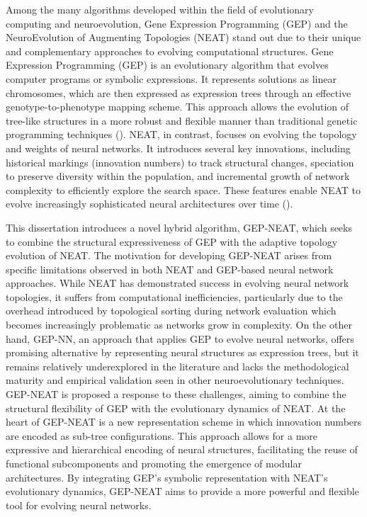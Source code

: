 \noindent Among the many algorithms developed within the field of evolutionary computing and neuroevolution, Gene Expression Programming (GEP) and the NeuroEvolution of Augmenting Topologies (NEAT) stand out due to their unique and complementary approaches to evolving computational structures. Gene Expression Programming (GEP) is an evolutionary algorithm that evolves computer programs or symbolic expressions. It represents solutions as linear chromosomes, which are then expressed as expression trees through an effective genotype-to-phenotype mapping scheme. This approach allows the evolution of tree-like structures in a more robust and flexible manner than traditional genetic programming techniques (\cite{ferreira2006gene}). NEAT, in contrast, focuses on evolving the topology and weights of neural networks. It introduces several key innovations, including historical markings (innovation numbers) to track structural changes, speciation to preserve diversity within the population, and incremental growth of network complexity to efficiently explore the search space. These features enable NEAT to evolve increasingly sophisticated neural architectures over time (\cite{stanley2002evolving}).

\parbreak

\noindent This dissertation introduces a novel hybrid algorithm, GEP-NEAT, which seeks to combine the structural expressiveness of GEP with the adaptive topology evolution of NEAT. The motivation for developing GEP-NEAT arises from specific limitations observed in both NEAT and GEP-based neural network approaches. While NEAT has demonstrated success in evolving neural network topologies, it suffers from computational inefficiencies, particularly due to the overhead introduced by topological sorting during network evaluation which becomes increasingly problematic as networks grow in complexity. On the other hand, GEP-NN, an approach that applies GEP to evolve neural networks, offers promising alternative by representing neural structures as expression trees, but it remains relatively underexplored in the literature and lacks the methodological maturity and empirical validation seen in other neuroevolutionary techniques. GEP-NEAT is proposed a response to these challenges, aiming to combine the structural flexibility of GEP with the evolutionary dynamics of NEAT. At the heart of GEP-NEAT is a new representation scheme in which innovation numbers are encoded as sub-tree configurations. This approach allows for a more expressive and hierarchical encoding of neural structures, facilitating the reuse of functional subcomponents and promoting the emergence of modular architectures. By integrating GEP's symbolic representation with NEAT's evolutionary dynamics, GEP-NEAT aims to provide a more powerful and flexible tool for evolving neural networks.

